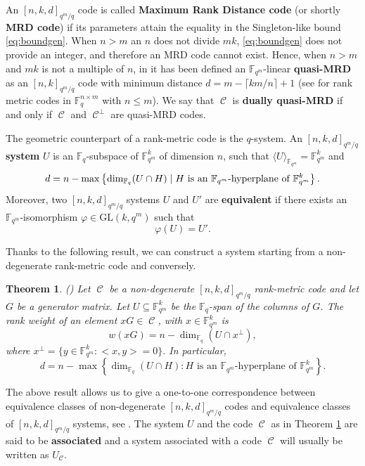\documentclass[11pt]{amsart}
\DeclareMathOperator{\C}{\mathcal{C}}
\newtheorem{theorem}{Theorem}[section]
\newcommand{\fqm}{\mathbb{F}_{q^m}}
\newcommand{\F}{{\mathbb F}}
\newcommand{\fq}{{\mathbb F}_{q}}
\begin{document}
An $[n,k,d]_{q^m/q}$ code is called \textbf{Maximum Rank Distance code} (or shortly \textbf{MRD code}) if its parameters attain the equality in the Singleton-like bound \eqref{eq:boundgen}.
When $n>m$ an $n$ does not divide $mk$, \eqref{eq:boundgen} does not provide an integer, and therefore an MRD code cannot exist. Hence, when $n>m$ and $mk$ is not a multiple of $n$, in \cite{marino2023evasive} it has been defined an $\fqm$-linear \textbf{quasi-MRD} as an $[n,k]_{q^m/q}$ code with minimum distance $d =m- \lceil km/n \rceil +1$ (see \cite{de2018weight} for rank metric codes in $\F_q^{n\times m}$ with $n\leq m$). We say that $\C$ is \textbf{dually quasi-MRD} if and only if $\C$ and $\C^\perp$ are quasi-MRD codes.


The geometric counterpart of a rank-metric code is the $q$-system. 
An $[n,k,d]_{q^m/q}$ \textbf{system} $U$ is an $\F_q$-subspace of $\F_{q^m}^k$ of dimension $n$, such that
$ \langle U \rangle_{\F_{q^m}}=\F_{q^m}^k$ and
$$ d=n-\max\left\{\dim_{\F_q}(U\cap H) \mid H \textnormal{ is an }\F_{q^m}\textnormal{-hyperplane of } \F_{q^m}^k\right\}.$$
Moreover, two $[n,k,d]_{q^m/q}$ systems $U$ and $U'$ are \textbf{equivalent} if there exists an $\F_{q^m}$-isomorphism $\varphi\in\mathrm{GL}(k,q^m)$ such that
$$ \varphi(U) = U'.$$


Thanks to the following result, we can construct a system starting from a non-degenerate rank-metric code and conversely.

\begin{theorem}(\cite{Randrianarisoa2020ageometric,alfarano2021linearcutting}) \label{th:connection}
Let $\C$ be a non-degenerate $[n,k,d]_{q^m/q}$ rank-metric code and let $G$ be a generator matrix.
Let $U \subseteq \F_{q^m}^k$ be the $\F_q$-span of the columns of $G$.
The rank weight of an element $x G \in \C$, with $x \in \F_{q^m}^k$ is
\begin{equation}\label{eq:relweight}
w(x G) = n - \dim_{\fq}(U \cap x^{\perp}),\end{equation}
where $x^{\perp}=\{y \in \F_{q^m}^k \colon <x, y>=0\}.$ In particular,
\begin{equation} \label{eq:distancedesign}
d=n - \max\left\{ \dim_{\fq}(U \cap H)  \colon H\mbox{ is an } \F_{q^m}\mbox{-hyperplane of }\F_{q^m}^k  \right\}.
\end{equation}
\end{theorem}

The above result allows us to give a one-to-one correspondence between equivalence classes of non-degenerate $[n,k,d]_{q^m/q}$ codes and equivalence classes of $[n,k,d]_{q^m/q}$ systems, see \cite{Randrianarisoa2020ageometric}.
The system $U$ and the code $\C$ as in Theorem \ref{th:connection} are said to be \textbf{associated} and a system associated with a code $\C$ will usually be written as $U_{\C}$.
\end{document}
